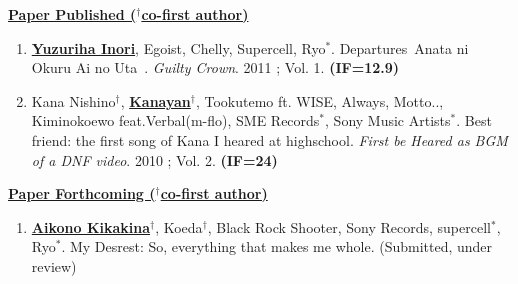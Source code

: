 \begin{publications}
\renewcommand{\ULthickness}{1.3pt} %
\noindent
\uline{\textbf{Paper Published ($^\dag{}$co-first author)}} %
\begin{enumerate}[leftmargin=*]
\item \uline{\textbf{Yuzuriha Inori}}, Egoist, Chelly, Supercell, Ryo$^*$. Departures~Anata ni Okuru Ai no Uta~. \textit{Guilty Crown}. 2011 ; Vol. 1. \textbf{(IF=12.9)}

\item Kana Nishino$^\dag{}$, \uline{\textbf{Kanayan$^\dag{}$}}, Tookutemo ft. WISE, Always, Motto.., Kiminokoewo feat.Verbal(m-flo), SME Records$^*$, Sony Music Artists$^*$. Best friend: the first song of Kana I heared at highschool. \textit{First be Heared as BGM of a DNF video}. 2010 ; Vol. 2. \textbf{(IF=24)}
\end{enumerate}

\noindent
\uline{\textbf{Paper Forthcoming ($^\dag{}$co-first author)}}
\begin{enumerate}[leftmargin=*]
\item \uline{\textbf{Aikono Kikakina$^\dag{}$}}, Koeda$^\dag{}$, Black Rock Shooter, Sony Records, supercell$^*$, Ryo$^*$. My Desrest: So, everything that makes me whole. (Submitted, under review)
\end{enumerate}

\end{publications}
